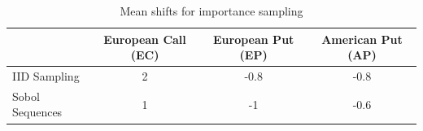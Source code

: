 \documentclass{ws-ijfe}
\begin{document}
\begin{table}[h]
 \caption{Mean shifts for importance sampling} %
 \centering                          %
 \begin{tabular}{lccc}          %
 \hline\hline                        %
  & European Call (EC) & European Put (EP) & American Put (AP)\\ [0.5ex]
 \hline                                      %
 IID Sampling & 2 & -0.8 & -0.8 \\
 Sobol Sequences & 1 & -1 & -0.6 \\[1ex] %
 \hline                                       %
 \end{tabular}
 \label{tab:params setup for IS}
\end{table}

\end{document}
